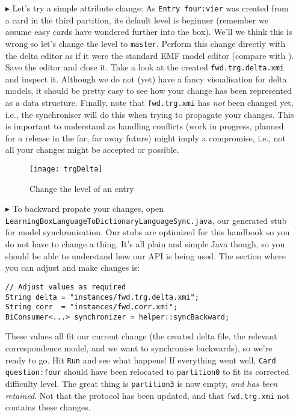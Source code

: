 \begin{itemize}
\item[$\blacktriangleright$] Let's try a simple attribute change:  As \texttt{Entry four:vier} was created from a card in the third partition, its default level is beginner (remember we assume easy cards have wondered further into the box).
We'll we think this is wrong so let's change the level to \texttt{master}.
Perform this change directly with the delta editor as if it were the standard EMF model editor (compare with ).
Save the editor and close it.
Take a look at the created \texttt{fwd.trg.delta.xmi} and inspect it.
Although we do not (yet) have a fancy visualisation for delta models, it should be pretty easy to see how your change has been represented as a data structure.
Finally, note that \texttt{fwd.trg.xmi} has \emph{not} been changed yet, i.e., the synchroniser will do this when trying to propagate your changes.
This is important to understand as handling conflicts (work in progress, planned for a release in the far, far away future) might imply a compromise, i.e., not all your changes might be accepted or possible.

\begin{figure}[htbp]
\begin{center}
  \texttt{[image: trgDelta]}
  \caption{Change the level of an entry}
  \label{fig:trgDelta}
\end{center}
\end{figure}

\item[$\blacktriangleright$] To backward propate your changes, open \texttt{Learning\-Box\-Language\-To\-Dictionary\-Language\-Sync.java}, our generated stub for model synchronisation.
Our stubs are optimized for this handbook so you do not have to change a thing.
It's all plain and simple Java though, so you should be able to understand how our API is being used.
The section where you can adjust and make changes is:
\begin{verbatim}
// Adjust values as required
String delta = "instances/fwd.trg.delta.xmi";
String corr  = "instances/fwd.corr.xmi";
BiConsumer<...> synchronizer = helper::syncBackward;
\end{verbatim}

These values all fit our current change (the created delta file, the relevant correspondence model, and we want to synchronise backwards), so we're ready to go.
Hit \texttt{Run} and see what happens!
If everything went well, \texttt{Card question:four} should have been relocated to \texttt{partition0} to fit its corrected difficulty level.
The great thing is \texttt{partition3} is now empty, \emph{and has been retained}.
Not that the protocol has been updated, and that \texttt{fwd.trg.xmi} not contains these changes.
\end{itemize}

